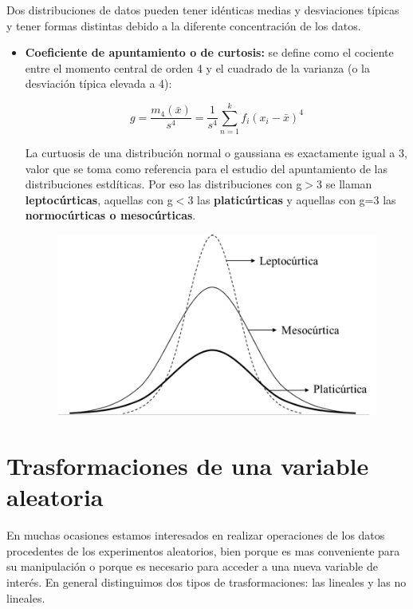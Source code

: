 \documentclass[12pt,a4paper]{book}
\begin{document}
Dos distribuciones de datos pueden tener idénticas medias y desviaciones típicas y tener formas distintas debido a la diferente concentración de los datos. 


\begin{itemize}

\item \textbf{Coeficiente de apuntamiento o de curtosis:} se define como el cociente entre el momento central de orden 4 y el cuadrado de la varianza (o la desviación típica elevada a 4):

\begin{equation}
g = \dfrac{m_4(\bar{x})}{s^4} = \dfrac{1}{s^4}  \sum_{n=1}^{k} f_i(x_i-     \bar{x} )^4
\end{equation}

La curtuosis de una distribución normal o gaussiana es exactamente igual a 3, valor que se toma como referencia para el estudio del apuntamiento de las distribuciones estdíticas. Por eso las distribuciones con g$>$3 se llaman \textbf{leptocúrticas}, aquellas con g$<$3 las \textbf{platicúrticas} y aquellas con g=3 las \textbf{normocúrticas o mesocúrticas}. 

\begin{figure}[h!] \centering
\includegraphics[scale=1]{Curticas.png}
\end{figure}


\end{itemize}


\newpage



\section{Trasformaciones de una variable aleatoria}

En muchas ocasiones estamos interesados en realizar operaciones de los datos procedentes de los experimentos aleatorios, bien porque es mas conveniente para su manipulación o porque es necesario para acceder a una nueva variable de interés. En general distinguimos dos tipos de trasformaciones: las lineales y las no lineales.  \\
\end{document}
